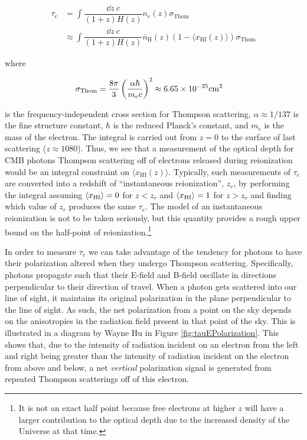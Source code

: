 \begin{align}
\tau_{e} &= \int \dfrac{\dd z\ c}{(1+z)H(z)}n_{e}(z)\sigma_{\text{Thom}}\\
&\approx \int \dfrac{\dd z\ c}{(1+z)H(z)} \bar{n}_{\text{H}}(z)(1 - \langle x_{\text{HI}}(z)\rangle) \sigma_{\text{Thom}}
\end{align}

where 

\begin{align}
\sigma_{\text{Thom}} &= \dfrac{8\pi}{3}\left(\dfrac{\alpha \hbar}{m_ec}\right)^2 \approx 6.65\times 10^{-25}\text{cm}^{2}
\end{align}

is the frequency-independent cross section for Thompson scattering, $\alpha \approx 1/137$ is the fine structure constant, $\hbar$ is the reduced Planck's constant, and $m_e$ is the mass of the electron. The integral is carried out from $z = 0$ to the surface of last scattering ($z \approx 1080$). Thus, we see that a measurement of the optical depth for CMB photons Thompson scattering off of electrons released during reionization would be an integral constraint on $\langle x_{\text{HI}}(z)\rangle$. Typically, such measurements of $\tau_{e}$ are converted into a redshift of ``instantaneous reionization'', $z_{r}$, by performing the integral assuming $\langle x_{\text{HI}}\rangle = 0$ for $z < z_{r}$ and $\langle x_{\text{HI}}\rangle = 1$ for $z > z_r$ and finding which value of $z_{r}$ produces the same $\tau_{e}$. The model of an instantaneous reionization is not to be taken seriously, but this quantity provides a rough upper bound on the half-point of reionization.\footnote{It is not an exact half point because free electrons at higher $z$ will have a larger contribution to the optical depth due to the increased density of the Universe at that time.} 


In order to measure $\tau_{e}$ we can take advantage of the tendency for photons to have their polarization altered when they undergo Thompson scattering. Specifically, photons propagate such that their E-field and B-field oscillate in directions perpendicular to their direction of travel. When a photon gets scattered into our line of sight, it maintains its original polarization in the plane perpendicular to the line of sight. As such, the net polarization from a point on the sky depends on the anisotropies in the radiation field present in that point of the sky. This is illustrated in a diagram by Wayne Hu in Figure \ref{fig:tauEPolarization}. This shows that, due to the intensity of radiation incident on an electron from the left and right being greater than the intensity of radiation incident on the electron from above and below, a net \textit{vertical} polarization signal is generated from repeated Thompson scatterings off of this electron. 


